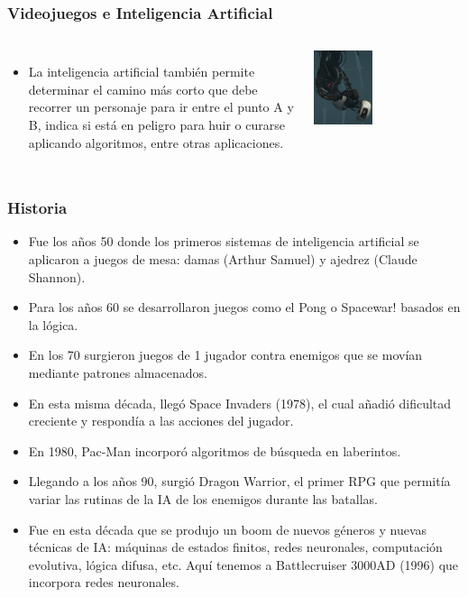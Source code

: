 \documentclass[aspectratio=169]{beamer}
\begin{document}
\begin{frame}
\frametitle{Videojuegos e Inteligencia Artificial}
\begin{columns}
\begin{itemize}[<+->]
\item La inteligencia artificial también permite determinar el camino más corto
  que debe recorrer un personaje para ir entre el punto A y B, indica si está
  en peligro para huir o curarse aplicando algoritmos, entre otras
  aplicaciones.
\end{itemize}
\begin{center}
  \includegraphics[width=0.4\textwidth]{./images/ai.jpeg}
\end{center}
\end{columns}
\end{frame}

\begin{frame}
\frametitle{Historia}
\begin{itemize}[<+->]
\item Fue los años 50 donde los primeros sistemas de inteligencia artificial se
  aplicaron a juegos de mesa: damas (Arthur Samuel) y ajedrez (Claude Shannon).
\item Para los años 60 se desarrollaron juegos como el Pong o Spacewar! basados
  en la lógica. 
\item En los 70 surgieron juegos de 1 jugador contra enemigos que se movían
  mediante patrones almacenados. 
\item En esta misma década, llegó Space Invaders (1978), el cual añadió
  dificultad creciente y respondía a las acciones del jugador.
\item En 1980, Pac-Man incorporó algoritmos de búsqueda en laberintos. 
\item Llegando a los años 90, surgió Dragon Warrior, el primer RPG que permitía
  variar las rutinas de la IA de los enemigos durante las batallas.
\item Fue en esta década que se produjo un boom de nuevos géneros y nuevas
técnicas de IA: máquinas de estados finitos, redes neuronales, computación
evolutiva, lógica difusa, etc. Aquí tenemos a Battlecruiser 3000AD (1996)
que incorpora redes neuronales.
\end{itemize}
\end{frame}
\end{document}
